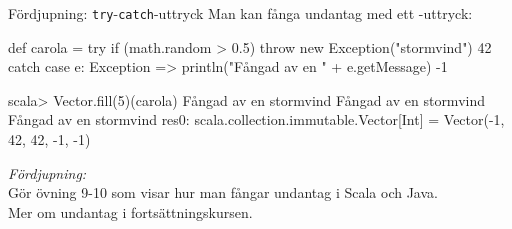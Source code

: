 \begin{Slide}{Fördjupning: \texttt{try}-\texttt{catch}-uttryck}\SlideFontSmall
Man kan fånga undantag med ett -uttryck:
\begin{Code}
def carola = try {
  if (math.random > 0.5) throw new Exception("stormvind")
  42
} catch { 
  case e: Exception =>
    println("Fångad av en " + e.getMessage)
    -1
}  
\end{Code}
\pause
\begin{REPL}
scala> Vector.fill(5)(carola)
Fångad av en stormvind
Fångad av en stormvind
Fångad av en stormvind
res0: scala.collection.immutable.Vector[Int] = Vector(-1, 42, 42, -1, -1)
\end{REPL}
\pause
\emph{Fördjupning:} \\ Gör övning 9-10 som visar hur man fångar undantag i Scala och Java. \\Mer om undantag i fortsättningskursen.
\end{Slide}


\fi





